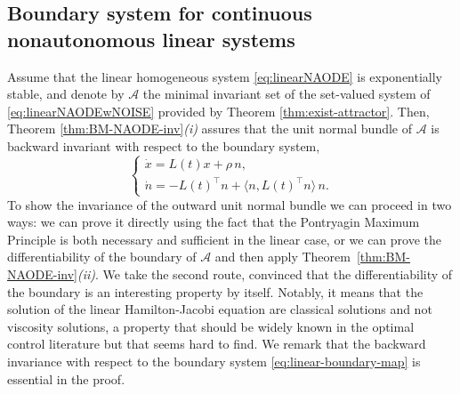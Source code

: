 \documentclass[reqno]{amsart}
\newtheorem{prop}[thm]{Proposition}
\theoremstyle{definition}
\numberwithin{equation}{section}
\newcommand{\R}{\mathbb{R}}
\newcommand{\A}{\mathcal{A}}
\newcommand{\U}{\mathcal{U}}
\newcommand\note[1]{\marginpar{\flushleft\sffamily\tiny #1}}
\begin{document}

\subsection{Boundary system for continuous nonautonomous linear systems}%
Assume that  the linear homogeneous system \eqref{eq:linearNAODE} is exponentially stable, and denote by $\A$ the minimal invariant set of the set-valued system of \eqref{eq:linearNAODEwNOISE} provided by Theorem \ref{thm:exist-attractor}. Then, Theorem \ref{thm:BM-NAODE-inv}\textit{(i)} assures that the unit normal bundle of $\A$ is backward invariant with respect to the boundary system,
\begin{equation}\label{eq:linear-boundary-map}
\begin{cases}
    \dot x=L(t)x+\rho\,n,\\
    \dot n=-L(t)^\top n+\langle n,L(t)^\top n\rangle\, n.
\end{cases}
\end{equation}
To show the invariance of the outward unit normal bundle we can proceed in two ways: we can prove it directly using the fact that the Pontryagin Maximum Principle is both necessary and sufficient in the linear case, or we can prove the differentiability of the boundary of $\A$ and then apply  Theorem~\ref{thm:BM-NAODE-inv}\textit{(ii)}. We take the second route, convinced that the differentiability of the boundary is an interesting property by itself. Notably, it means that the solution of the linear Hamilton-Jacobi equation are classical solutions and not viscosity solutions, a property that should be widely known in the optimal control literature but that seems hard to find. We remark that the backward invariance with respect to the boundary system \eqref{eq:linear-boundary-map} is essential in the proof.
\end{document}
